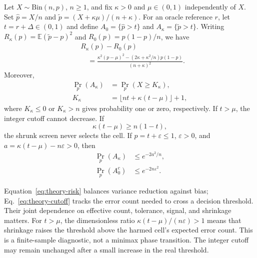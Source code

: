 \begin{proposition}
\label{prop:theory-shrinkage}
Let $X\sim\mathrm{Bin}(n,p)$, $n\ge1$, and fix $\kappa>0$ and
$\mu\in(0,1)$ independently of $X$. Set
$\widehat p=X/n$ and $\widetilde p=(X+\kappa\mu)/(n+\kappa)$.
For an oracle reference $r$, let $t=r+\Delta\in(0,1)$ and define
$A_0=\{\widehat p>t\}$ and $A_\kappa=\{\widetilde p>t\}$.
Writing $R_\kappa(p)=\mathbb E(\widetilde p-p)^2$ and
$R_0(p)=p(1-p)/n$, we have
\begin{equation}
 \begin{aligned}
 &R_\kappa(p)-R_0(p)\\
 &\quad=\frac{\kappa^2(p-\mu)^2-(2\kappa+\kappa^2/n)p(1-p)}
 {(n+\kappa)^2}.
 \end{aligned}
 \label{eq:theory-risk}
\end{equation}
Moreover,
\begin{equation}
 \begin{aligned}
 \Pr_p(A_\kappa)&=\Pr_p(X\ge K_\kappa),\\
 K_\kappa&=\lfloor nt+\kappa(t-\mu)\rfloor+1,
 \end{aligned}
 \label{eq:theory-cutoff}
\end{equation}
where $K_\kappa\le0$ or $K_\kappa>n$ gives probability one or zero,
respectively. If $t>\mu$, the integer cutoff cannot decrease. If
\begin{equation}
 \kappa(t-\mu)\ge n(1-t),
 \label{eq:theory-collapse}
\end{equation}
the shrunk screen never selects the cell. If $p=t+\varepsilon\le1$,
$\varepsilon>0$, and $a=\kappa(t-\mu)-n\varepsilon>0$, then
\begin{equation}
 \begin{aligned}
 \Pr_p(A_\kappa)&\le e^{-2a^2/n},\\
 \Pr_p(A_0^c)&\le e^{-2n\varepsilon^2}.
 \end{aligned}
 \label{eq:theory-screen-bound}
\end{equation}
\end{proposition}

Equation~\eqref{eq:theory-risk} balances variance reduction against bias;
Eq.~\eqref{eq:theory-cutoff} tracks the error count needed to cross a
decision threshold. Their joint dependence on effective count, tolerance,
signal, and shrinkage matters. For $t>\mu$, the dimensionless ratio
$\kappa(t-\mu)/(n\varepsilon)>1$ means that shrinkage raises the threshold
above the harmed cell's expected error count. This is a finite-sample
diagnostic, not a minimax phase transition. The integer cutoff may remain
unchanged after a small increase in the real threshold.

